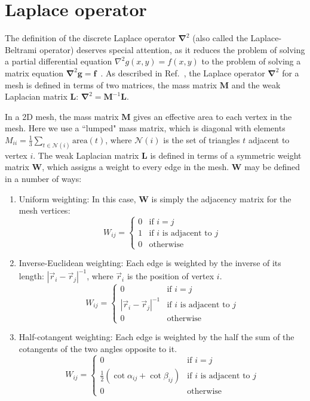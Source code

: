 \documentclass[final,3p,times,twocolumn]{elsarticle}
\newcounter{bla}
\begin{document}
\section{Laplace operator}
\label{appendix:laplace}

The definition of the discrete Laplace operator $\mathbf{\nabla}^2$ (also called the Laplace-Beltrami operator) deserves special attention, as it reduces the problem of solving a partial differential equation $\nabla^2g(x,y)=f(x,y)$ to the problem of solving a matrix equation
$\mathbf{\nabla}^2\mathbf{g}=\mathbf{f}$~\cite{Reuter2009-hr}. As described in Ref.~\cite{Crane_Vouga_2014}, the Laplace operator $\mathbf{\nabla}^2$ for a mesh is defined in terms of two matrices, the mass matrix $\mathbf{M}$ and the
weak Laplacian matrix $\mathbf{L}$: $\mathbf{\nabla}^2 = \mathbf{M}^{-1}\mathbf{L}$.

In a 2D mesh, the mass matrix $\mathbf{M}$ gives an effective area to each vertex in the mesh. Here we use a ``lumped" mass matrix, which is diagonal with elements $M_{ii} = \frac{1}{3}\sum_{t\in\mathcal{N}(i)}\mathrm{area}(t)$,
where $\mathcal{N}(i)$ is the set of triangles $t$ adjacent to vertex $i$. The weak Laplacian matrix $\mathbf{L}$ is defined in terms of a symmetric weight matrix $\mathbf{W}$, which assigns a weight to every edge in the mesh. $\mathbf{W}$ may be defined in a number of ways:

\begin{enumerate}
    \item{
        Uniform weighting: In this case, $\mathbf{W}$ is simply the adjacency matrix for the mesh vertices:
        $$
            W_{ij} =
            \begin{cases}
                0&\text{if }i=j\\
                1&\text{if }i\text{ is adjacent to }j\\
                0&\text{otherwise}
            \end{cases}
        $$
    }
    \item{
        Inverse-Euclidean weighting: Each edge is weighted by the inverse of its length: $|\vec{r}_i-\vec{r}_j|^{-1}$, where $\vec{r}_i$ is the position of vertex $i$.
        $$
            W_{ij} =
            \begin{cases}
                0&\text{if }i=j\\
                |\vec{r}_i-\vec{r}_j|^{-1}&\text{if }i\text{ is adjacent to }j\\
                0&\text{otherwise}
            \end{cases}
        $$
    }
    \item{
        Half-cotangent weighting: Each edge is weighted by the half the sum of the cotangents of the two angles opposite to it.
        $$
            W_{ij} =
            \begin{cases}
                0&\text{if }i=j\\
                \frac{1}{2}\left(\cot\alpha_{ij}+\cot\beta_{ij}\right)&\text{if }i\text{ is adjacent to }j\\
                0&\text{otherwise}
            \end{cases}
        $$
    }
\end{enumerate}
\end{document}
